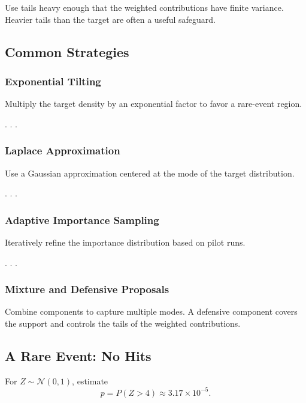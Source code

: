 \documentclass[
  letterpaper,
  DIV=11,
  numbers=noendperiod]{scrartcl}
\begin{document}
Use tails heavy enough that the weighted contributions have finite
variance. Heavier tails than the target are often a useful safeguard.

\subsection{Common Strategies}\label{common-strategies}

\subsubsection{Exponential Tilting}\label{exponential-tilting}

Multiply the target density by an exponential factor to favor a
rare-event region.

. . .

\subsubsection{Laplace Approximation}\label{laplace-approximation}

Use a Gaussian approximation centered at the mode of the target
distribution.

. . .

\subsubsection{Adaptive Importance
Sampling}\label{adaptive-importance-sampling}

Iteratively refine the importance distribution based on pilot runs.

. . .

\subsubsection{Mixture and Defensive
Proposals}\label{mixture-and-defensive-proposals}

Combine components to capture multiple modes. A defensive component
covers the support and controls the tails of the weighted contributions.

\subsection{A Rare Event: No Hits}\label{a-rare-event-no-hits}

For \(Z \sim \mathcal{N}(0,1)\), estimate \[
  p = P(Z > 4) \approx 3.17 \times 10^{-5}.
\]
\end{document}
